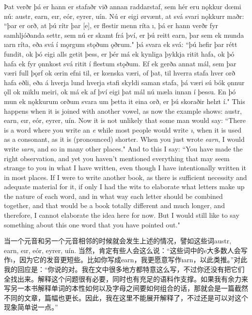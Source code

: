 \begin{paracol}{2}
    Þat verðr þá er hann er stafaðr við annan raddarstaf, sem hér eru nǫkkur dœmi nú: austr, earn, eır, eór, eyrer, uín. Nú er eigi ørvænt, at svá svari nǫkkurr maðr: ``þar er orð, at þú rítr þar [e], er flestir menn ríta ı, þá er hann verðr fyr samhljóðanda settr, sem nú er skamt frá því, er þú reitt earn, þar sem ek munda ıarn ríta, eða svá í mǫrgum stǫðum ǫðrum." þá svara ek svá: ``þú hefir þar rétt fundit, ok þó eigi alls getit þess, er þér má ek kynliga þykkja ritit hafa, ok þó hafa ek fyr ǫnnkost svá ritit í flestum stǫðum. Ef ek gerða annat mál, sem þar væri full þǫrf ok œrin efni til, er kœnska væri, of þat, til hverra stafa hver orð hafa eðli, eða á hverja lund hverja stafi skyldi saman stafa, þá væri sú bók ǫnnur ǫll ok miklu meiri, ok má ek af því eigi þat mál nú mæla innan í þessu. En þó mun ek nǫkkurum orðum svara um þetta it eina orð, er þú skoraðir helzt í."
    \switchcolumn
    This happens when it is joined with another vowel, as now the example shows: austr, earn, eır, eór, eyrer, uín. Now it is not unlikely that some man would say: ``There is a word where you write an \textit{e} while most people would write \textit{ı}, when it is used as a consonant, as it is (pronounced) shorter. When you just wrote \textit{earn}, I would write \textit{ıarn}, and so in many other places." And to this I say: ``You have made the right observation, and yet you haven't mentioned everything that may seem strange to you in what I have written, even though I have intentionally written it in most places. If I were to write another book, as there is sufficient necessity and adequate material for it, if only I had the wits to elaborate what letters make up the nature of each word, and in what way each letter should be combined together, and that would be a book totally different and much longer, and therefore, I cannot elaborate the idea here for now. But I would still like to say something about this one word that you have pointed out."
\end{paracol}
\begin{translation*}{}
    当一个元音和另一个元音相邻的时候就会发生上述的情况，譬如这些词austr, earn, eır, eór, eyrer, uín. 当然，肯定有些人会这么说：“这些词中的e大多数人会写作ı，因为它的发音更短些。比如你写成earn，我更愿意写作ıarn，以此类推。”对此我的回应是：“你说的对。我在文中很多地方都特意这么写，不过你还没有把它们全找出来。解释这个问题很有必要，同时也有充足的语料作支撑。如果我有余力来写另一本书解释单词的本性如何以及字母之间要如何组合的话，那就会是一篇截然不同的文章，篇幅也更长。因此，我在这里不能展开解释了，不过还是可以对这个现象简单说一点。”
\end{translation*}

